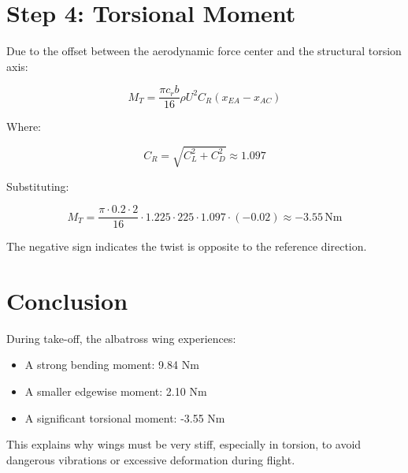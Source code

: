 \documentclass[12pt]{article}
\begin{document}
\section*{Step 4: Torsional Moment}

Due to the offset between the aerodynamic force center and the structural torsion axis:

\[
M_T = \frac{\pi c_r b}{16} \rho U^2 C_R (x_{EA} - x_{AC})
\]

Where:

\[
C_R = \sqrt{C_L^2 + C_D^2} \approx 1.097
\]

Substituting:

\[
M_T = \frac{\pi \cdot 0.2 \cdot 2}{16} \cdot 1.225 \cdot 225 \cdot 1.097 \cdot (-0.02) \approx \boxed{-3.55 \, \text{Nm}}
\]

The negative sign indicates the twist is opposite to the reference direction.

\section*{Conclusion}

During take-off, the albatross wing experiences:

\begin{itemize}
    \item A strong bending moment: 9.84 Nm
    \item A smaller edgewise moment: 2.10 Nm
    \item A significant torsional moment: -3.55 Nm
\end{itemize}

This explains why wings must be very stiff, especially in torsion, to avoid dangerous vibrations or excessive deformation during flight.
\end{document}
